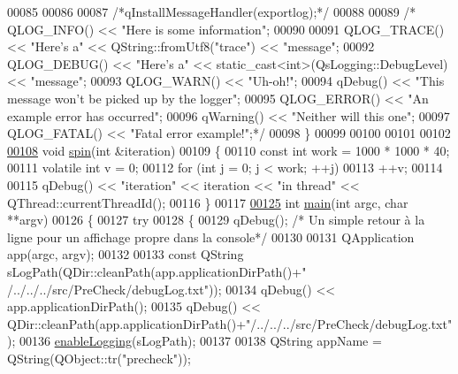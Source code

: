 \begin{DoxyCode}
{00085 
00086 
00087     \textcolor{comment}{/*qInstallMessageHandler(exportlog);*/}
00088 
00089     \textcolor{comment}{/* QLOG\_INFO() << "Here is some information";}
00090 \textcolor{comment}{}
00091 \textcolor{comment}{        QLOG\_TRACE() << "Here's a" << QString::fromUtf8("trace") << "message";}
00092 \textcolor{comment}{        QLOG\_DEBUG() << "Here's a" << static\_cast<int>(QsLogging::DebugLevel) << "message";}
00093 \textcolor{comment}{        QLOG\_WARN()  << "Uh-oh!";}
00094 \textcolor{comment}{        qDebug() << "This message won't be picked up by the logger";}
00095 \textcolor{comment}{        QLOG\_ERROR() << "An example error has occurred";}
00096 \textcolor{comment}{        qWarning() << "Neither will this one";}
00097 \textcolor{comment}{        QLOG\_FATAL() << "Fatal error example!";*/}
00098 \}
00099 
00100 
00101 
00102 
\hypertarget{main_8cpp_source_l00108}{}\hyperlink{main_8cpp_ae410a0b90b40ede93034f3ec13d27b8e}{00108} \textcolor{keywordtype}{void} \hyperlink{main_8cpp_ae410a0b90b40ede93034f3ec13d27b8e}{spin}(\textcolor{keywordtype}{int} &iteration)
00109 \{
00110     \textcolor{keyword}{const} \textcolor{keywordtype}{int} work = 1000 * 1000 * 40;
00111     \textcolor{keyword}{volatile} \textcolor{keywordtype}{int} v = 0;
00112     \textcolor{keywordflow}{for} (\textcolor{keywordtype}{int} j = 0; j < work; ++j)
00113         ++v;
00114 
00115     qDebug() << \textcolor{stringliteral}{"iteration"} << iteration << \textcolor{stringliteral}{"in thread"} << QThread::currentThreadId();
00116 \}
00117 
\hypertarget{main_8cpp_source_l00125}{}\hyperlink{main_8cpp_a3c04138a5bfe5d72780bb7e82a18e627}{00125} \textcolor{keywordtype}{int} \hyperlink{main_8cpp_a3c04138a5bfe5d72780bb7e82a18e627}{main}(\textcolor{keywordtype}{int} argc, \textcolor{keywordtype}{char} **argv)
00126 \{
00127     \textcolor{keywordflow}{try}
00128     \{
00129         qDebug();  \textcolor{comment}{/* Un simple retour à la ligne pour un affichage propre dans la console*/}
00130 
00131         QApplication app(argc, argv);
00132 
00133         \textcolor{keyword}{const} QString sLogPath(QDir::cleanPath(app.applicationDirPath()+\textcolor{stringliteral}{"
      /../../../src/PreCheck/debugLog.txt"}));
00134         qDebug() << app.applicationDirPath();
00135         qDebug() << QDir::cleanPath(app.applicationDirPath()+\textcolor{stringliteral}{"/../../../src/PreCheck/debugLog.txt"});
00136         \hyperlink{main_8cpp_ac3c79e35c4fc5c50939ae90485e1483f}{enableLogging}(sLogPath);
00137 
00138         QString appName = QString(QObject::tr(\textcolor{stringliteral}{"precheck"}));
}
\end{DoxyCode}
